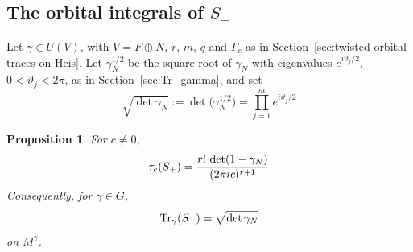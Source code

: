 \documentclass[11pt]{amsart}
\theoremstyle{plain}
\newtheorem{proposition}[theorem]{Proposition}
\theoremstyle{definition}
\theoremstyle{remark}
\begin{document}
\subsection{The orbital integrals of $S_+$}\label{sec:Szego orbital integrals}

Let $\gamma\in U(V)$, with $V=F\oplus N$, $r$, $m$, $q$ and $\Gamma_c$ as in Section~\ref{sec:twisted orbital traces on Heis}.
Let $\gamma_N^{1/2}$ be the square root of $\gamma_N$ with eigenvalues $e^{i\vartheta_j/2}$, $0<\vartheta_j<2\pi$, as in Section~\ref{sec:Tr_gamma}, and set
\[ \sqrt{\det\gamma_N}:=\det\bigl(\gamma_N^{1/2}\bigr)=\prod_{j=1}^m e^{i\vartheta_j/2}\]

\begin{proposition}\label{prop:Szego orbital values}
For $c\ne0$,
\[ \tau_{c}(S_+)=\frac{r!\,\det(1-\gamma_N)}{(2\pi i c)^{r+1}}\]
Consequently, for $\gamma\in G$,
\[ \operatorname{Tr}_\gamma(S_+)=\sqrt{\det\gamma_N}\]
on $M^\gamma$.
\end{proposition}
\end{document}
